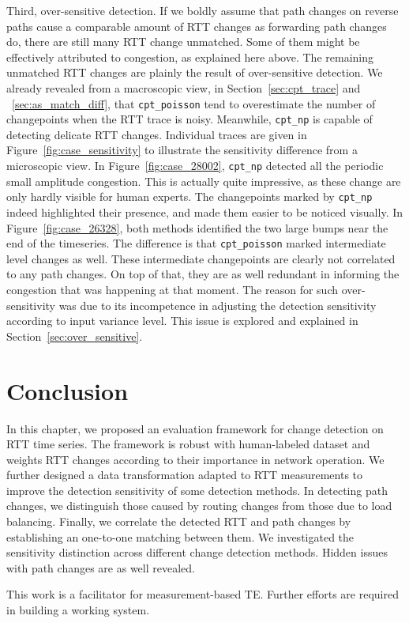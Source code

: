 Third, over-sensitive detection.
If we boldly assume that path changes on reverse paths cause a comparable amount of RTT changes as forwarding path changes do, there are still many RTT change unmatched.
Some of them might be effectively attributed to congestion, as explained here above.
The remaining unmatched RTT changes are plainly the result of over-sensitive detection.
We already revealed from a macroscopic view, in Section~\ref{sec:cpt_trace} and ~\ref{sec:as_match_diff}, that \texttt{cpt\_poisson} tend to overestimate the number of changepoints when the RTT trace is noisy.
Meanwhile, \texttt{cpt\_np} is capable of detecting delicate RTT changes. 
Individual traces are given in Figure~\ref{fig:case_sensitivity} to illustrate the sensitivity difference from a microscopic view. 
In Figure~\ref{fig:case_28002}, \texttt{cpt\_np} detected all the periodic small amplitude congestion.
This is actually quite impressive, as these change are only hardly visible for human experts.
The changepoints marked by \texttt{cpt\_np} indeed highlighted their presence, and made them easier to be noticed visually.
In Figure~\ref{fig:case_26328}, both methods identified the two large bumps near the end of the timeseries.
The difference is that \texttt{cpt\_poisson} marked intermediate level changes as well.
These intermediate changepoints are clearly not correlated to any path changes.
On top of that, they are as well redundant in informing the congestion that was happening at that moment.
The reason for such over-sensitivity was due to its incompetence in adjusting the detection sensitivity according to input variance level. This issue is explored and explained in Section~\ref{sec:over_sensitive}.

\section*{Conclusion}
In this chapter, we proposed an evaluation framework for change detection on RTT time series.
The framework is robust with human-labeled dataset and weights RTT changes according to their importance in network operation. 
We further designed a data transformation adapted to RTT measurements to improve the detection sensitivity of some detection methods.
In detecting path changes, we distinguish those caused by routing changes from those due to load balancing.
Finally, we correlate the detected RTT and path changes by establishing an one-to-one matching between them. 
We investigated the sensitivity distinction across different change detection methods. 
Hidden issues with path changes are as well revealed.

This work is a facilitator for measurement-based TE. 
Further efforts are required in building a working system.
